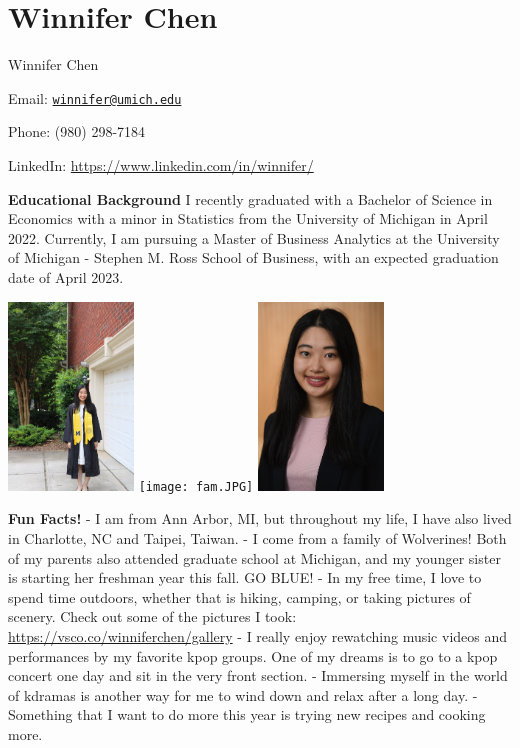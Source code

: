 \documentclass[
]{book}
\begin{document}
\hypertarget{winnifer-chen}{%
\section{Winnifer Chen}\label{winnifer-chen}}

Winnifer Chen

Email: \href{mailto:winnifer@umich.edu}{\nolinkurl{winnifer@umich.edu}}

Phone: (980) 298-7184

LinkedIn: \url{https://www.linkedin.com/in/winnifer/}

\textbf{Educational Background}
I recently graduated with a Bachelor of Science in Economics with a minor in Statistics from the University of Michigan in April 2022. Currently, I am pursuing a Master of Business Analytics at the University of Michigan - Stephen M. Ross School of Business, with an expected graduation date of April 2023.

\includegraphics[width=0.25\textwidth,height=\textheight]{grad.JPG}
\texttt{[image: fam.JPG]}
\includegraphics[width=0.25\textwidth,height=\textheight]{headshot.jpg}

\textbf{Fun Facts!}
- I am from Ann Arbor, MI, but throughout my life, I have also lived in Charlotte, NC and Taipei, Taiwan.
- I come from a family of Wolverines! Both of my parents also attended graduate school at Michigan, and my younger sister is starting her freshman year this fall. GO BLUE!
- In my free time, I love to spend time outdoors, whether that is hiking, camping, or taking pictures of scenery. Check out some of the pictures I took: \url{https://vsco.co/winniferchen/gallery}
- I really enjoy rewatching music videos and performances by my favorite kpop groups. One of my dreams is to go to a kpop concert one day and sit in the very front section.
- Immersing myself in the world of kdramas is another way for me to wind down and relax after a long day.
- Something that I want to do more this year is trying new recipes and cooking more.
\end{document}
